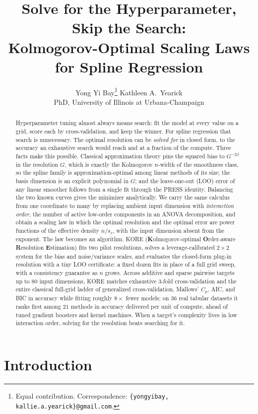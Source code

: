 \documentclass{article}
\title{{\fontsize{16pt}{19pt}\selectfont Solve for the Hyperparameter, Skip the Search:} \\Kolmogorov-Optimal Scaling Laws for Spline Regression}
\author{
Yong Yi Bay\thanks{Equal contribution. Correspondence: \texttt{\{yongyibay, kallie.a.yearick\}@gmail.com}.} \hspace{1cm} Kathleen A.\ Yearick\footnotemark[1] \\[3pt]
{\normalfont PhD, University of Illinois at Urbana-Champaign}
}
\newcommand{\KORE}{\textsc{KORE}}
\begin{document}
\maketitle

\begin{abstract}
Hyperparameter tuning almost always means search: fit the model at every value on a grid, score each by cross-validation, and keep the winner. For spline regression that search is unnecessary. The optimal resolution can be \emph{solved for} in closed form, to the accuracy an exhaustive search would reach and at a fraction of the compute. Three facts make this possible. Classical approximation theory pins the squared bias to $G^{-2\beta}$ in the resolution $G$, which is exactly the Kolmogorov $n$-width of the smoothness class, so the spline family is approximation-optimal among linear methods of its size; the basis dimension is an explicit polynomial in $G$; and the leave-one-out (LOO) error of any linear smoother follows from a single fit through the PRESS identity. Balancing the two known curves gives the minimizer analytically. We carry the same calculus from one coordinate to many by replacing ambient input dimension with \emph{interaction order}, the number of active low-order components in an ANOVA decomposition, and obtain a scaling law in which the optimal resolution and the optimal error are power functions of the effective density $n / s_r$, with the input dimension absent from the exponent. The law becomes an algorithm. \KORE{} (\textbf{K}olmogorov-optimal \textbf{O}rder-aware \textbf{R}esolution \textbf{E}stimation) fits two pilot resolutions, solves a leverage-calibrated $2\times2$ system for the bias and noise/variance scales, and evaluates the closed-form plug-in resolution with a tiny LOO certificate: a fixed dozen fits in place of a full grid sweep, with a consistency guarantee as $n$ grows. Across additive and sparse pairwise targets up to $80$ input dimensions, \KORE{} matches exhaustive $3$-fold cross-validation and the entire classical full-grid ladder of generalized cross-validation, Mallows' $C_p$, AIC, and BIC in accuracy while fitting roughly $8\times$ fewer models; on $36$ real tabular datasets it ranks first among $21$ methods in accuracy delivered per unit of compute, ahead of tuned gradient boosters and kernel machines. When a target's complexity lives in low interaction order, solving for the resolution beats searching for it.
\end{abstract}

\section{Introduction}
\label{sec:intro}
\end{document}
